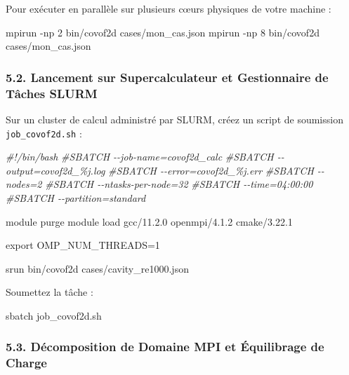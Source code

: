 \documentclass[
  french,
]{article}
\newenvironment{Shaded}{}{}
\newcommand{\AttributeTok}[1]{\textcolor[rgb]{0.49,0.56,0.16}{#1}}
\newcommand{\BuiltInTok}[1]{\textcolor[rgb]{0.00,0.50,0.00}{#1}}
\newcommand{\CommentTok}[1]{\textcolor[rgb]{0.38,0.63,0.69}{\textit{#1}}}
\newcommand{\ExtensionTok}[1]{#1}
\newcommand{\NormalTok}[1]{#1}
\newcommand{\OperatorTok}[1]{\textcolor[rgb]{0.40,0.40,0.40}{#1}}
\newcommand{\VariableTok}[1]{\textcolor[rgb]{0.10,0.09,0.49}{#1}}
\begin{document}
Pour exécuter en parallèle sur plusieurs cœurs physiques de votre
machine :

\begin{Shaded}
\begin{Highlighting}[]
\ExtensionTok{mpirun} \AttributeTok{{-}np}\NormalTok{ 2 bin/covof2d cases/mon\_cas.json}
\ExtensionTok{mpirun} \AttributeTok{{-}np}\NormalTok{ 8 bin/covof2d cases/mon\_cas.json}
\end{Highlighting}
\end{Shaded}

\subsubsection{5.2. Lancement sur Supercalculateur et Gestionnaire de
Tâches
SLURM}\label{lancement-sur-supercalculateur-et-gestionnaire-de-tuxe2ches-slurm}

Sur un cluster de calcul administré par SLURM, créez un script de
soumission \texttt{job\_covof2d.sh} :

\begin{Shaded}
\begin{Highlighting}[]
\CommentTok{\#!/bin/bash}
\CommentTok{\#SBATCH {-}{-}job{-}name=covof2d\_calc}
\CommentTok{\#SBATCH {-}{-}output=covof2d\_\%j.log}
\CommentTok{\#SBATCH {-}{-}error=covof2d\_\%j.err}
\CommentTok{\#SBATCH {-}{-}nodes=2}
\CommentTok{\#SBATCH {-}{-}ntasks{-}per{-}node=32}
\CommentTok{\#SBATCH {-}{-}time=04:00:00}
\CommentTok{\#SBATCH {-}{-}partition=standard}

\ExtensionTok{module}\NormalTok{ purge}
\ExtensionTok{module}\NormalTok{ load gcc/11.2.0 openmpi/4.1.2 cmake/3.22.1}

\BuiltInTok{export} \VariableTok{OMP\_NUM\_THREADS}\OperatorTok{=}\NormalTok{1}

\ExtensionTok{srun}\NormalTok{ bin/covof2d cases/cavity\_re1000.json}
\end{Highlighting}
\end{Shaded}

Soumettez la tâche :

\begin{Shaded}
\begin{Highlighting}[]
\ExtensionTok{sbatch}\NormalTok{ job\_covof2d.sh}
\end{Highlighting}
\end{Shaded}

\subsubsection{5.3. Décomposition de Domaine MPI et Équilibrage de
Charge}\label{duxe9composition-de-domaine-mpi-et-uxe9quilibrage-de-charge}
\end{document}
